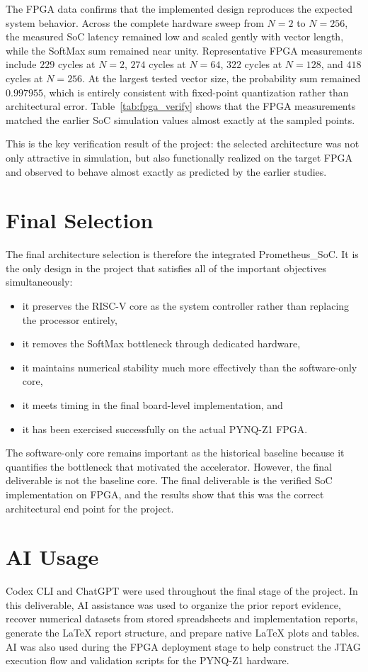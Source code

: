 \documentclass[11pt]{article}
\begin{document}
The FPGA data confirms that the implemented design reproduces the expected system behavior. Across the complete hardware sweep from $N=2$ to $N=256$, the measured SoC latency remained low and scaled gently with vector length, while the SoftMax sum remained near unity. Representative FPGA measurements include $229$ cycles at $N=2$, $274$ cycles at $N=64$, $322$ cycles at $N=128$, and $418$ cycles at $N=256$. At the largest tested vector size, the probability sum remained $0.997955$, which is entirely consistent with fixed-point quantization rather than architectural error. Table~\ref{tab:fpga_verify} shows that the FPGA measurements matched the earlier SoC simulation values almost exactly at the sampled points.

This is the key verification result of the project: the selected architecture was not only attractive in simulation, but also functionally realized on the target FPGA and observed to behave almost exactly as predicted by the earlier studies.

\section{Final Selection}

The final architecture selection is therefore the integrated Prometheus\_SoC. It is the only design in the project that satisfies all of the important objectives simultaneously:

\begin{itemize}
    \item it preserves the RISC-V core as the system controller rather than replacing the processor entirely,
    \item it removes the SoftMax bottleneck through dedicated hardware,
    \item it maintains numerical stability much more effectively than the software-only core,
    \item it meets timing in the final board-level implementation, and
    \item it has been exercised successfully on the actual PYNQ-Z1 FPGA.
\end{itemize}

The software-only core remains important as the historical baseline because it quantifies the bottleneck that motivated the accelerator. However, the final deliverable is not the baseline core. The final deliverable is the verified SoC implementation on FPGA, and the results show that this was the correct architectural end point for the project.

\section{AI Usage}

Codex CLI and ChatGPT were used throughout the final stage of the project. In this deliverable, AI assistance was used to organize the prior report evidence, recover numerical datasets from stored spreadsheets and implementation reports, generate the LaTeX report structure, and prepare native \LaTeX{} plots and tables. AI was also used during the FPGA deployment stage to help construct the JTAG execution flow and validation scripts for the PYNQ-Z1 hardware.
\end{document}
